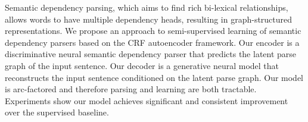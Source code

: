 Semantic dependency parsing, which aims to find rich bi-lexical relationships, allows words to have multiple dependency heads, resulting in graph-structured representations. We propose an approach to semi-supervised learning of semantic dependency parsers based on the CRF autoencoder framework. Our encoder is a discriminative neural semantic dependency parser that predicts the latent parse graph of the input sentence. Our decoder is a generative neural model that reconstructs the input sentence conditioned on the latent parse graph. Our model is arc-factored and therefore parsing and learning are both tractable. Experiments show our model achieves significant and consistent improvement over the supervised baseline.
